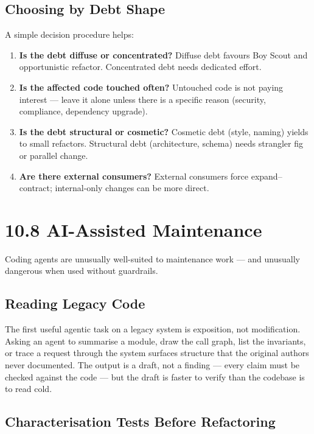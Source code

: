 \documentclass[11pt,a4paper]{book}
\begin{document}
\subsection{Choosing by Debt Shape}

A simple decision procedure helps:

\begin{enumerate}
  \item \textbf{Is the debt diffuse or concentrated?} Diffuse debt favours Boy Scout and opportunistic refactor. Concentrated debt needs dedicated effort.
  \item \textbf{Is the affected code touched often?} Untouched code is not paying interest --- leave it alone unless there is a specific reason (security, compliance, dependency upgrade).
  \item \textbf{Is the debt structural or cosmetic?} Cosmetic debt (style, naming) yields to small refactors. Structural debt (architecture, schema) needs strangler fig or parallel change.
  \item \textbf{Are there external consumers?} External consumers force expand--contract; internal-only changes can be more direct.
\end{enumerate}

\medskip

\section{10.8 AI-Assisted Maintenance}

Coding agents are unusually well-suited to maintenance work --- and unusually dangerous when used without guardrails.

\subsection{Reading Legacy Code}

The first useful agentic task on a legacy system is exposition, not modification. Asking an agent to summarise a module, draw the call graph, list the invariants, or trace a request through the system surfaces structure that the original authors never documented. The output is a draft, not a finding --- every claim must be checked against the code --- but the draft is faster to verify than the codebase is to read cold.

\subsection{Characterisation Tests Before Refactoring}
\end{document}
